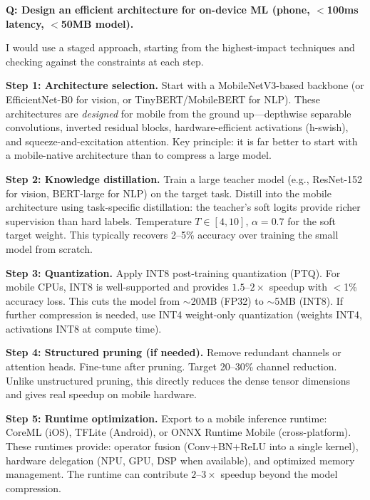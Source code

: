 \begin{interviewq}
\textbf{Q: Design an efficient architecture for on-device ML (phone, $<$100ms latency, $<$50MB model).}

 \quad {} \quad \badgefreq{\freqhigh}

\stronganswer

I would use a staged approach, starting from the highest-impact techniques and checking against the constraints at each step.

\textbf{Step 1: Architecture selection.} Start with a MobileNetV3-based backbone (or EfficientNet-B0 for vision, or TinyBERT/MobileBERT for NLP). These architectures are \textit{designed} for mobile from the ground up---depthwise separable convolutions, inverted residual blocks, hardware-efficient activations (h-swish), and squeeze-and-excitation attention. Key principle: it is far better to start with a mobile-native architecture than to compress a large model.

\textbf{Step 2: Knowledge distillation.} Train a large teacher model (e.g., ResNet-152 for vision, BERT-large for NLP) on the target task. Distill into the mobile architecture using task-specific distillation: the teacher's soft logits provide richer supervision than hard labels. Temperature $T \in [4, 10]$, $\alpha = 0.7$ for the soft target weight. This typically recovers 2--5\% accuracy over training the small model from scratch.

\textbf{Step 3: Quantization.} Apply INT8 post-training quantization (PTQ). For mobile CPUs, INT8 is well-supported and provides $1.5$--$2\times$ speedup with $<$1\% accuracy loss. This cuts the model from $\sim$20MB (FP32) to $\sim$5MB (INT8). If further compression is needed, use INT4 weight-only quantization (weights INT4, activations INT8 at compute time).

\textbf{Step 4: Structured pruning (if needed).} Remove redundant channels or attention heads. Fine-tune after pruning. Target 20--30\% channel reduction. Unlike unstructured pruning, this directly reduces the dense tensor dimensions and gives real speedup on mobile hardware.

\textbf{Step 5: Runtime optimization.} Export to a mobile inference runtime: CoreML (iOS), TFLite (Android), or ONNX Runtime Mobile (cross-platform). These runtimes provide: operator fusion (Conv+BN+ReLU into a single kernel), hardware delegation (NPU, GPU, DSP when available), and optimized memory management. The runtime can contribute $2$--$3\times$ speedup beyond the model compression.


\end{interviewq}
